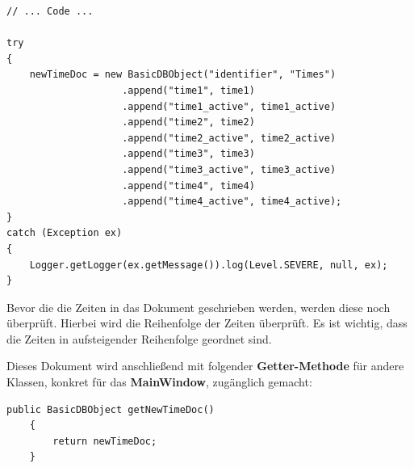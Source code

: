\newpage

\begin{lstlisting}[style=Javastyle, caption=Zeitendokument]
// ... Code ...

try
{
	newTimeDoc = new BasicDBObject("identifier", "Times")
					.append("time1", time1)
					.append("time1_active", time1_active)
					.append("time2", time2)
					.append("time2_active", time2_active)
					.append("time3", time3)
					.append("time3_active", time3_active)
					.append("time4", time4)
					.append("time4_active", time4_active);
}
catch (Exception ex)
{
	Logger.getLogger(ex.getMessage()).log(Level.SEVERE, null, ex);
}
\end{lstlisting}

Bevor die die Zeiten in das Dokument geschrieben werden, werden diese noch überprüft. Hierbei wird die Reihenfolge der Zeiten überprüft. Es ist wichtig, dass die Zeiten in aufsteigender Reihenfolge geordnet sind.

\vspace{10pt}

Dieses Dokument wird anschließend mit folgender \textbf{Getter-Methode} für andere Klassen, konkret für das \textbf{MainWindow}, zugänglich gemacht:
\begin{lstlisting}[style=Javastyle, caption=Zeitendokument Getter-Methode]
public BasicDBObject getNewTimeDoc()
    {
        return newTimeDoc;
    }
\end{lstlisting}

\newpage

